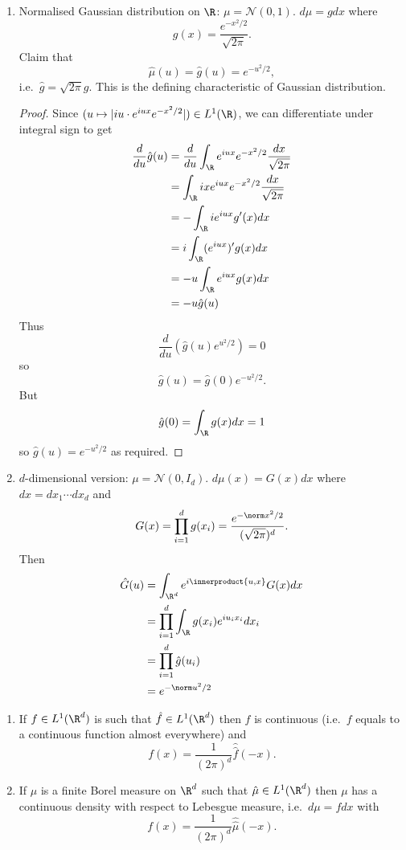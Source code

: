 \documentclass[a4paper]{article}
\newcommand*{\ip}{\innerproduct} %
\begin{document}
\begin{eg}\leavevmode
  \begin{enumerate}
  \item Normalised Gaussian distribution on \(\R\): \(\mu = \mathcal N(0, 1)\). \(d\mu = g dx\) where
    \[
      g(x) = \frac{e^{-x^2/2}}{\sqrt{2\pi}}.
    \]
    Claim that
    \[
      \hat \mu (u) = \hat g(u) = e^{-u^2/2},
    \]
    i.e.\ \(\hat g = \sqrt{2\pi} g\). This is the defining characteristic of Gaussian distribution.

    \begin{proof}
      Since \((u \mapsto |iu \cdot e^{iux} e^{-x^2/2}|) \in L^1(\R)\), we can differentiate under integral sign to get
      \begin{align*}
        \frac{d}{du} \hat g(u)
        &= \frac{d}{du} \int_\R e^{iux} e^{-x^2/2} \frac{dx}{\sqrt{2\pi}} \\
        &= \int_\R ix e^{iux} e^{-x^2/2} \frac{dx}{\sqrt{2\pi}} \\
        &= -\int_\R i e^{iux} g'(x) dx \\
        &= i \int_\R (e^{iux})' g(x) dx \\
        &= -u \int_\R e^{iux} g(x) dx \\
        &= -u \hat g(u)
      \end{align*}
      Thus
      \[
        \frac{d}{du} (\hat g(u) e^{u^2/2}) = 0
      \]
      so
      \[
        \hat g(u) = \hat g(0) e^{-u^2/2}.
      \]
      But
      \[
        \hat g(0) = \int_\R g(x) dx = 1
      \]
      so \(\hat g(u) = e^{-u^2/2}\) as required.
    \end{proof}
  \item \(d\)-dimensional version: \(\mu = \mathcal N(0, I_d)\). \(d\mu(x) = G(x) dx\) where \(dx = dx_1\cdots dx_d\) and
    \[
      G(x) = \prod_{i = 1}^d g(x_i)= \frac{e^{-\norm x^2/2}}{(\sqrt{2\pi})^d}.
    \]
    Then
    \begin{align*}
      \hat G(u)
      &= \int_{\R^d} e^{i\ip{u, x}} G(x) dx \\
      &= \prod_{i = 1}^d \int_\R g(x_i) e^{iu_i x_i} dx_i \\
      &= \prod_{i = 1}^d \hat g(u_i) \\
      &= e^{-\norm u^2/2}
    \end{align*}
  \end{enumerate}
\end{eg}

\begin{theorem}\leavevmode
  \begin{enumerate}
  \item If \(f \in L^1(\R^d)\) is such that \(\hat f \in L^1(\R^d)\) then \(f\) is continuous (i.e.\ \(f\) equals to a continuous function almost everywhere) and
    \[
      f(x) = \frac{1}{(2\pi)^d} \hat{\hat f} (-x).
    \]
  \item If \(\mu\) is a finite Borel measure on \(\R^d\) such that \(\hat \mu \in L^1(\R^d)\) then \(\mu\) has a continuous density with respect to Lebesgue measure, i.e.\ \(d\mu = f dx\) with
    \[
      f(x) = \frac{1}{(2\pi)^d} \hat{\hat \mu} (-x).
    \]
  \end{enumerate}
\end{theorem}
\end{document}
